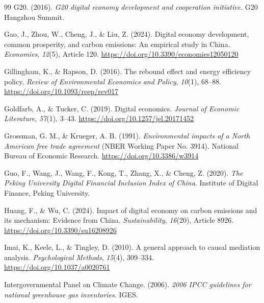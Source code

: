 \documentclass[economies,article,submit,moreauthors]{Definitions/mdpi}
\begin{document}
\begin{thebibliography}{99}
G20. (2016). \textit{G20 digital economy development and cooperation initiative}. G20 Hangzhou Summit.

Gao, J., Zhou, W., Cheng, J., \& Liu, Z. (2024). Digital economy development, common prosperity, and carbon emissions: An empirical study in China. \textit{Economies}, \textit{12}(5), Article 120. \url{https://doi.org/10.3390/economies12050120}

Gillingham, K., \& Rapson, D. (2016). The rebound effect and energy efficiency policy. \textit{Review of Environmental Economics and Policy}, \textit{10}(1), 68--88. \url{https://doi.org/10.1093/reep/rev017}

Goldfarb, A., \& Tucker, C. (2019). Digital economics. \textit{Journal of Economic Literature}, \textit{57}(1), 3--43. \url{https://doi.org/10.1257/jel.20171452}

Grossman, G. M., \& Krueger, A. B. (1991). \textit{Environmental impacts of a North American free trade agreement} (NBER Working Paper No. 3914). National Bureau of Economic Research. \url{https://doi.org/10.3386/w3914}

Guo, F., Wang, J., Wang, F., Kong, T., Zhang, X., \& Cheng, Z. (2020). \textit{The Peking University Digital Financial Inclusion Index of China}. Institute of Digital Finance, Peking University.

Huang, F., \& Wu, C. (2024). Impact of digital economy on carbon emissions and its mechanism: Evidence from China. \textit{Sustainability}, \textit{16}(20), Article 8926. \url{https://doi.org/10.3390/su16208926}

Imai, K., Keele, L., \& Tingley, D. (2010). A general approach to causal mediation analysis. \textit{Psychological Methods}, \textit{15}(4), 309--334. \url{https://doi.org/10.1037/a0020761}

Intergovernmental Panel on Climate Change. (2006). \textit{2006 IPCC guidelines for national greenhouse gas inventories}. IGES.


\end{thebibliography}
\end{document}
